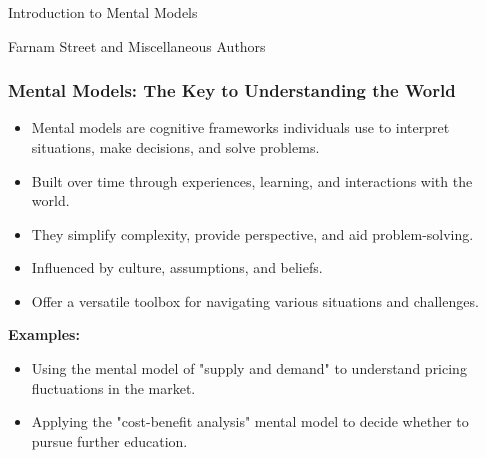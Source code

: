 \begin{frame}[fragile]\frametitle{}
\begin{center}
{\Large Introduction to Mental Models}

{\tiny Farnam Street and Miscellaneous Authors }


\end{center}
\end{frame}

\begin{frame}[fragile]\frametitle{Mental Models: The Key to Understanding the World}
\begin{itemize}
    \item Mental models are cognitive frameworks individuals use to interpret situations, make decisions, and solve problems.
    \item Built over time through experiences, learning, and interactions with the world.
    \item They simplify complexity, provide perspective, and aid problem-solving.
    \item Influenced by culture, assumptions, and beliefs.
    \item Offer a versatile toolbox for navigating various situations and challenges.
\end{itemize}
\textbf{Examples:}
\begin{itemize}
    \item Using the mental model of "supply and demand" to understand pricing fluctuations in the market.
    \item Applying the "cost-benefit analysis" mental model to decide whether to pursue further education.
\end{itemize}
\end{frame}

